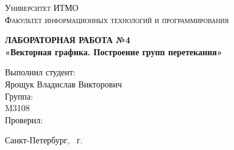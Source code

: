 \begin{titlepage}
\begin{center}
\textsc{
Университет ИТМО\\[3mm]
Факультет информационных технологий и программирования}

\vfill

\textbf{
ЛАБОРАТОРНАЯ РАБОТА №4\\[3mm]
«Векторная графика. Построение групп перетекания»\\[20mm]}
\end{center}

\hfill
\begin{minipage}{.5\textwidth}
Выполнил студент:\\[2mm] 
Ярощук Владислав Викторович\\[4mm]
Группа:\\[2mm]
M3108\\[5mm]

Проверил:\\[7mm] 
\end{minipage}%
\vfill
\begin{center}
Санкт-Петербург, \theyear\ г.
\end{center}
\end{titlepage}
